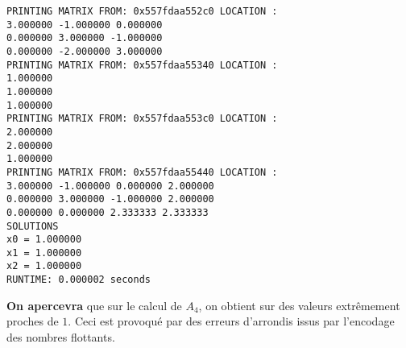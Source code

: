 \begin{lstlisting}[caption=Matrix 6 results, basicstyle=\fontsize{8}{10}\selectfont]
PRINTING MATRIX FROM: 0x557fdaa552c0 LOCATION :
3.000000 -1.000000 0.000000
0.000000 3.000000 -1.000000
0.000000 -2.000000 3.000000
PRINTING MATRIX FROM: 0x557fdaa55340 LOCATION :
1.000000
1.000000
1.000000
PRINTING MATRIX FROM: 0x557fdaa553c0 LOCATION :
2.000000
2.000000
1.000000
PRINTING MATRIX FROM: 0x557fdaa55440 LOCATION :
3.000000 -1.000000 0.000000 2.000000
0.000000 3.000000 -1.000000 2.000000
0.000000 0.000000 2.333333 2.333333
SOLUTIONS
x0 = 1.000000
x1 = 1.000000
x2 = 1.000000
RUNTIME: 0.000002 seconds                       
\end{lstlisting}
\textbf{On apercevra} que sur le calcul de $A_4$, on obtient sur des valeurs extrêmement proches de $1$. Ceci est provoqué par des erreurs d'arrondis issus par l'encodage des nombres flottants.  